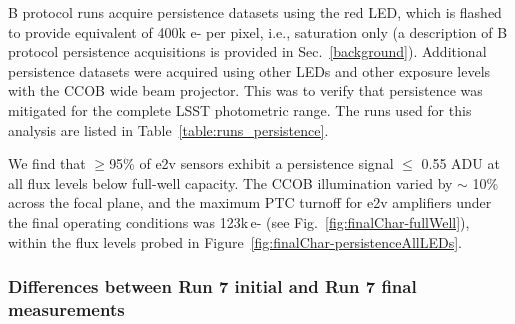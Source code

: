 B protocol runs acquire persistence datasets using the red LED, which is flashed to provide equivalent of 400k e- per pixel, i.e., saturation only (a description of B protocol persistence acquisitions is provided in Sec.~\ref{background}). Additional persistence datasets were acquired using other LEDs and other exposure levels with the CCOB wide beam projector. This was to verify that persistence was mitigated for the complete LSST photometric range. The runs used for this analysis are listed in Table~\ref{table:runs_persistence}. 

We find that $\geq$95\% of e2v sensors exhibit a persistence signal $\leq$ 0.55 ADU at all flux levels below full-well capacity. The CCOB illumination varied by $\sim$ 10\% across the focal plane, and the maximum PTC turnoff for e2v amplifiers under the final operating conditions was 123k\,e- (see Fig.~\ref{fig:finalChar-fullWell}), within the flux levels probed in Figure~\ref{fig:finalChar-persistenceAllLEDs}.

\subsubsection{Differences between Run 7 initial and Run 7 final measurements}\label{final-differences-from-previous-runs}

